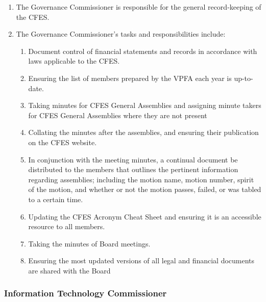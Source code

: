 \begin{enumerate}
 \item
  The Governance Commissioner is responsible for the general record-keeping of the CFES.
 \item
  The Governance Commissioner’s tasks and responsibilities include:

  \begin{enumerate}
   \item
    Document control of financial statements and records in accordance with laws applicable to the CFES.
   \item
    Ensuring the list of members prepared by the VPFA each year is up-to-date.
   \item
    Taking minutes for CFES General Assemblies and assigning minute takers for CFES General Assemblies where they are not present
   \item
    Collating the minutes after the assemblies, and ensuring their publication on the CFES website.
   \item
    In conjunction with the meeting minutes, a continual document be distributed to the members that outlines the pertinent information regarding assemblies; including the motion name, motion number, spirit of the motion, and whether or not the motion passes, failed, or was tabled to a certain time.
   \item
    Updating the CFES Acronym Cheat Sheet and ensuring it is an accessible resource to all members.
   \item
    Taking the minutes of Board meetings.
   \item
    Ensuring the most updated versions of all legal and financial documents are shared with the Board
  \end{enumerate}
\end{enumerate}

\subsubsection{Information Technology Commissioner}
\label{information-technology-commissioner}

